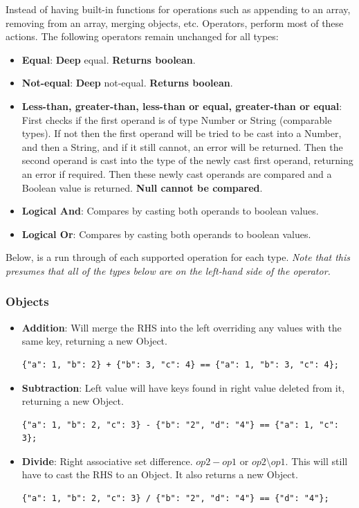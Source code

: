 \documentclass[]{full}
\theoremstyle{definition}
\begin{document}
Instead of having built-in functions for operations such as appending to an array, removing from an array, merging objects, etc. Operators, perform most of these actions. The following operators remain unchanged for all types:

\begin{itemize}
    \item \textbf{Equal}: \textbf{Deep} equal. \textbf{Returns boolean}.
    \item \textbf{Not-equal}: \textbf{Deep} not-equal. \textbf{Returns boolean}.
    \item \textbf{Less-than, greater-than, less-than or equal, greater-than or equal}: First checks if the first operand is of type Number or String (comparable types). If not then the first operand will be tried to be cast into a Number, and then a String, and if it still cannot, an error will be returned. Then the second operand is cast into the type of the newly cast first operand, returning an error if required. Then these newly cast operands are compared and a Boolean value is returned. \textbf{Null cannot be compared}.
    \item \textbf{Logical And}: Compares by casting both operands to boolean values.
    \item \textbf{Logical Or}: Compares by casting both operands to boolean values.
\end{itemize}

Below, is a run through of each supported operation for each type. \textit{Note that this presumes that all of the types below are on the left-hand side of the operator.}

\subsubsection{Objects}

\begin{itemize}
    \item \textbf{Addition}: Will merge the RHS into the left overriding any values with the same key, returning a new Object.
    \begin{verbatim}
{"a": 1, "b": 2} + {"b": 3, "c": 4} == {"a": 1, "b": 3, "c": 4};
    \end{verbatim}
    \item \textbf{Subtraction}: Left value will have keys found in right value deleted from it, returning a new Object.
    \begin{verbatim}
{"a": 1, "b": 2, "c": 3} - {"b": "2", "d": "4"} == {"a": 1, "c": 3};
    \end{verbatim}
    \item \textbf{Divide}: Right associative set difference. $op2 - op1$ or $op2 \setminus op1$. This will still have to cast the RHS to an Object. It also returns a new Object.
    \begin{verbatim}
{"a": 1, "b": 2, "c": 3} / {"b": "2", "d": "4"} == {"d": "4"};
    \end{verbatim}
\end{itemize}
\end{document}
